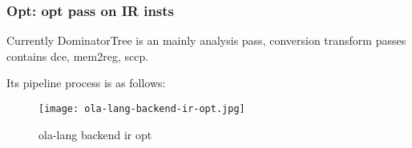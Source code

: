 \subsubsection{Opt: opt pass on IR insts}

Currently DominatorTree is an mainly analysis pass, conversion transform passes contains dce, mem2reg, sccp.

Its pipeline process is as follows:
\begin{figure}[!htbp]
    \centering
    \texttt{[image: ola-lang-backend-ir-opt.jpg]}
    \caption{ola-lang backend ir opt}
    \label{fig:ola-lang-backend-ir-opt}
\end{figure}